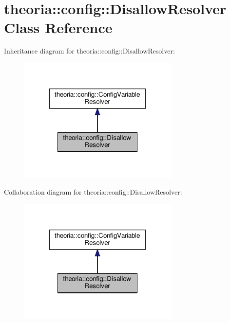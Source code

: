 \hypertarget{classtheoria_1_1config_1_1DisallowResolver}{}\section{theoria\+:\+:config\+:\+:Disallow\+Resolver Class Reference}
\label{classtheoria_1_1config_1_1DisallowResolver}


Inheritance diagram for theoria\+:\+:config\+:\+:Disallow\+Resolver\+:
\nopagebreak
\begin{figure}[H]
\begin{center}
\leavevmode
\includegraphics[width=228pt]{classtheoria_1_1config_1_1DisallowResolver__inherit__graph}
\end{center}
\end{figure}


Collaboration diagram for theoria\+:\+:config\+:\+:Disallow\+Resolver\+:
\nopagebreak
\begin{figure}[H]
\begin{center}
\leavevmode
\includegraphics[width=228pt]{classtheoria_1_1config_1_1DisallowResolver__coll__graph}
\end{center}
\end{figure}
